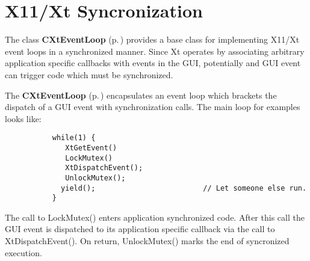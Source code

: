 \section{X11/Xt Syncronization}\label{XTSynchronization}


The class {\bf CXt\-Event\-Loop} {\rm (p.\,\pageref{classCXtEventLoop})} provides a base class for implementing X11/Xt event  loops in a synchronized manner. Since Xt operates by associating arbitrary application specific callbacks with events in the GUI, potentially and GUI event can trigger code which must be synchronized.

The {\bf CXt\-Event\-Loop} {\rm (p.\,\pageref{classCXtEventLoop})} encapsulates an event loop which brackets the dispatch of a GUI event with synchronization calls. The main loop for examples looks like:



\footnotesize\begin{verbatim}           while(1) {
              XtGetEvent()
              LockMutex()
              XtDispatchEvent();
              UnlockMutex();
             yield();                         // Let someone else run.
           }
\end{verbatim}\normalsize 


The call to Lock\-Mutex() enters application synchronized code. After this call the GUI event is dispatched to its application specific callback via the call to Xt\-Dispatch\-Event(). On return, Unlock\-Mutex() marks the end of  syncronized execution.

